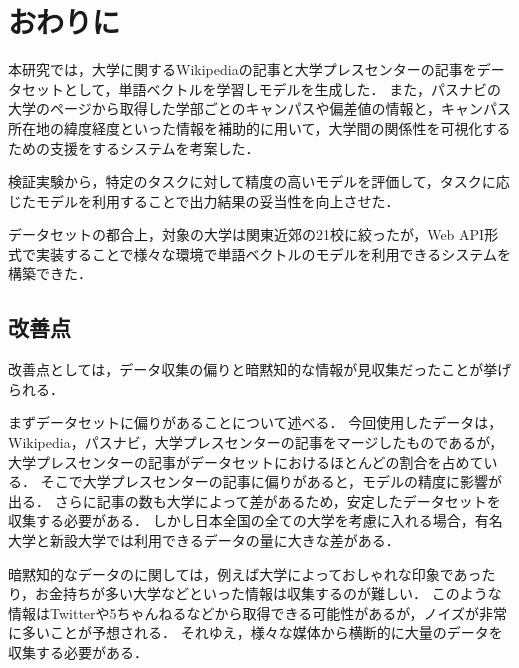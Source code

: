 \chapter{おわりに}
本研究では，大学に関するWikipediaの記事と大学プレスセンターの記事をデータセットとして，単語ベクトルを学習しモデルを生成した．
また，パスナビの大学のページから取得した学部ごとのキャンパスや偏差値の情報と，キャンパス所在地の緯度経度といった情報を補助的に用いて，大学間の関係性を可視化するための支援をするシステムを考案した．

検証実験から，特定のタスクに対して精度の高いモデルを評価して，タスクに応じたモデルを利用することで出力結果の妥当性を向上させた．

データセットの都合上，対象の大学は関東近郊の21校に絞ったが，Web API形式で実装することで様々な環境で単語ベクトルのモデルを利用できるシステムを構築できた．

\section{改善点}
改善点としては，データ収集の偏りと暗黙知的な情報が見収集だったことが挙げられる．

まずデータセットに偏りがあることについて述べる．
今回使用したデータは，Wikipedia，パスナビ，大学プレスセンターの記事をマージしたものであるが，大学プレスセンターの記事がデータセットにおけるほとんどの割合を占めている．
そこで大学プレスセンターの記事に偏りがあると，モデルの精度に影響が出る．
さらに記事の数も大学によって差があるため，安定したデータセットを収集する必要がある．
しかし日本全国の全ての大学を考慮に入れる場合，有名大学と新設大学では利用できるデータの量に大きな差がある．

暗黙知的なデータのに関しては，例えば大学によっておしゃれな印象であったり，お金持ちが多い大学などといった情報は収集するのが難しい．
このような情報はTwitterや5ちゃんねるなどから取得できる可能性があるが，ノイズが非常に多いことが予想される．
それゆえ，様々な媒体から横断的に大量のデータを収集する必要がある．